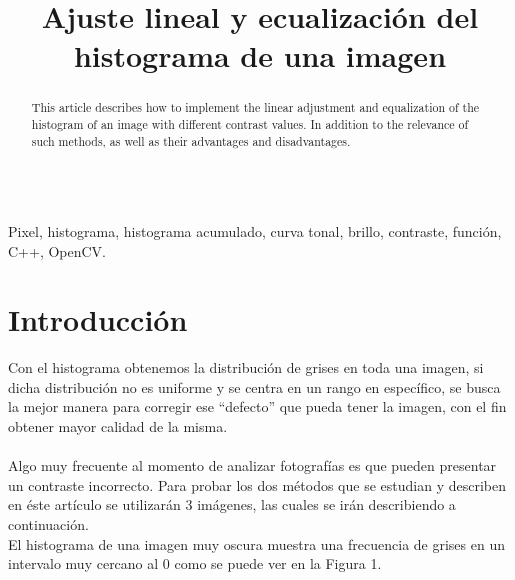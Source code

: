 \documentclass[conference]{IEEEtran}
\begin{document}
\title{ Ajuste lineal y ecualizaci\'on del histograma de una imagen}
\author{
}

\maketitle
\renewcommand\abstractname{Abstract}
\begin{abstract}
This article describes how to implement the linear adjustment and equalization of the histogram of an image with different contrast values. In addition to the relevance of such methods, as well as their advantages and disadvantages. \\\\
\end{abstract}

\begin{IEEEkeywords}
Pixel, histograma, histograma acumulado, curva tonal, brillo, contraste, funci\'on, C++, OpenCV.
\end{IEEEkeywords}

\IEEEpeerreviewmaketitle
\section{Introducci\'on}
Con el histograma obtenemos la distribuci\'on de grises en toda una imagen, si dicha distribuci\'on no es uniforme y se centra en un rango en espec\'ifico, se busca la mejor manera para corregir ese ``defecto'' que pueda tener la imagen, con el fin obtener mayor calidad de la misma.\\\\
Algo muy frecuente al momento de analizar fotograf\'ias es que pueden presentar un contraste incorrecto. Para probar los dos m\'etodos que se estudian y describen en \'este art\'iculo se utilizar\'an 3 im\'agenes, las cuales se ir\'an describiendo a continuaci\'on.\\
El histograma de una imagen muy oscura muestra una frecuencia de grises en un intervalo muy cercano al 0 como se puede ver en la Figura 1.
\end{document}
